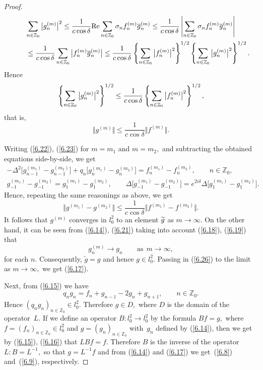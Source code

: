 \documentclass[11pt]{article}
\numberwithin{equation}{section}
\begin{document}
\begin{proof}
\begin{gather*}
\sum_{n\in
\mathbb{Z}
_{0}}\big\vert g_{n}^{(m)}\big\vert ^{2}\leq \frac{1}{c\cos \delta }%
{\rm Re}\sum_{n\in
\mathbb{Z}
_{0}}\sigma _{n}f_{n}^{(m)}\overline{g}_{n}^{(m)}
\leq \frac{1}{c\cos \delta }\left\vert \sum_{n\in
\mathbb{Z}
_{0}}\sigma _{n}f_{n}^{(m)}\overline{g}_{n}^{(m)}\right\vert \\
\qquad {} \leq \frac{1}{%
c\cos \delta }\sum_{n\in
\mathbb{Z}
_{0}}\big\vert f_{n}^{(m)}\overline{g}_{n}^{(m)}\big\vert
\leq \frac{1}{c\cos \delta }\left\{ \sum_{n\in
\mathbb{Z}
_{0}}\big\vert f_{n}^{(m)}\big\vert ^{2}\right\} ^{1/2}\left\{ \sum_{n\in
\mathbb{Z}
_{0}}\big\vert g_{n}^{(m)}\big\vert ^{2}\right\} ^{1/2}.
\end{gather*}
Hence%
\[
\left\{ \sum_{n\in
\mathbb{Z}
_{0}}\big\vert g_{n}^{(m)}\big\vert ^{2}\right\} ^{1/2}\leq \frac{1}{%
c\cos \delta }\left\{ \sum_{n\in
\mathbb{Z}
_{0}}\big\vert f_{n}^{(m)}\big\vert ^{2}\right\} ^{1/2},
\]%
that is,%
\begin{equation}
\big\Vert g^{(m)}\big\Vert \leq \frac{1}{c\cos \delta }\big\Vert
f^{(m)}\big\Vert .  \label{6.26}
\end{equation}

Writing (\ref{6.22}), (\ref{6.23}) for $m=m_{1}$ and $m=m_{2},$ and
subtracting the obtained equations side-by-side, we get%
\begin{gather*}
-\Delta
^{2}\big[g_{n-1}^{(m_{1})}-g_{n-1}^{(m_{2})}\big]+q_{n}\big[g_{n}^{(m_{1})}-g_{n}^{(m_{2})}\big]=f_{n}^{(m_{1})}-f_{n}^{(m_{2})},%
\qquad n\in
\mathbb{Z}
_{0},
\\
g_{-1}^{(m_{1})}-g_{-1}^{(m_{2})}=g_{1}^{(m_{1})}-g_{1}^{(m_{2})},\qquad \Delta \big[ g_{-1}^{(m_{1})}-g_{-1}^{(m_{2})}\big]=e^{2i\delta }\Delta
\big[ g_{1}^{(m_{1})}-g_{1}^{(m_{2})}\big].
\end{gather*}
Hence, repeating the same reasonings as above, we get%
\[
\big\Vert g^{(m_{1})}-g^{(m_{2})}\big\Vert \leq \frac{1}{c\cos \delta }%
\big\Vert f^{(m_{1})}-f^{(m_{2})}\big\Vert .
\]%
It follows that $g^{(m)}$ converges in $l_{0}^{2}$ to an element $\widetilde{%
g}$ as $m\rightarrow \infty .$ On the other hand, it can be seen from (\ref{6.14}), (\ref{6.21}) taking into account (\ref{6.18}), (\ref{6.19}) that%
\[
g_{n}^{(m)}\rightarrow g_{n}\qquad \text{as} \ \ m\rightarrow \infty ,
\]%
for each $n$. Consequently, $\widetilde{g}=g$ and hence $g\in l_{0}^{2}.$
Passing in (\ref{6.26}) to the limit as $m\rightarrow \infty ,$ we get (\ref{6.17}).

Next, from (\ref{6.15}) we have%
\[
q_{n}g_{n}=f_{n}+g_{n-1}-2g_{n}+g_{n+1},\qquad n\in
\mathbb{Z}
_{0}.
\]
Hence $(q_{n}g_{n})_{n\in
\mathbb{Z}
_{0}}\in l_{0}^{2}.$ Therefore $g\in D,$ where $D$ is the domain of the
operator~$L$. If we def\/ine an operator $B:l_{0}^{2}\rightarrow l_{0}^{2}$ by
the formula $Bf=g,$ where $f=(f_{n})_{n\in
\mathbb{Z}
_{0}}\in l_{0}^{2}$ and $g=(g_{n})_{n\in
\mathbb{Z}
_{0}}$ with~$g_{n}$ def\/ined by (\ref{6.14}), then we get by (\ref{6.15}), (\ref{6.16}) that $LBf=f.$ Therefore $B$ is the inverse of the operator $%
L:B=L^{-1},$ so that $g=L^{-1}f$ and from (\ref{6.14}) and (\ref{6.17}) we
get~(\ref{6.8}) and~(\ref{6.9}), respectively.
\end{proof}
\end{document}
